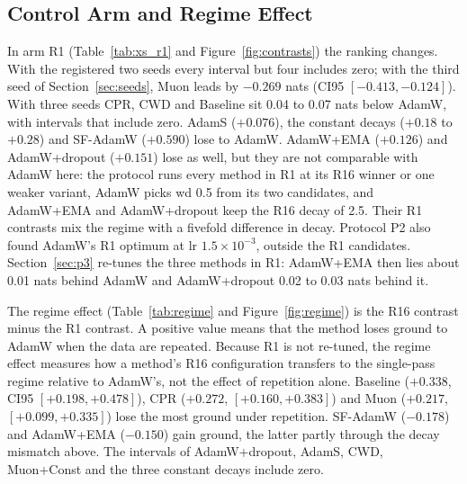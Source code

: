 \documentclass[twoside,11pt]{article}
\begin{document}
\subsection{Control Arm and Regime Effect}
\label{sec:r1}

In arm R1 (Table~\ref{tab:xs_r1} and Figure~\ref{fig:contrasts}) the ranking changes. With the registered two seeds every interval but four includes zero; with the third seed of Section~\ref{sec:seeds}, Muon leads by $-0.269$ nats (CI95 $[-0.413, -0.124]$). With three seeds CPR, CWD and Baseline sit 0.04 to 0.07 nats below AdamW, with intervals that include zero. AdamS ($+0.076$), the constant decays ($+0.18$ to $+0.28$) and SF-AdamW ($+0.590$) lose to AdamW. AdamW+EMA ($+0.126$) and AdamW+dropout ($+0.151$) lose as well, but they are not comparable with AdamW here: the protocol runs every method in R1 at its R16 winner or one weaker variant, AdamW picks wd 0.5 from its two candidates, and AdamW+EMA and AdamW+dropout keep the R16 decay of 2.5. Their R1 contrasts mix the regime with a fivefold difference in decay. Protocol P2 also found AdamW's R1 optimum at lr $1.5\times10^{-3}$, outside the R1 candidates. Section~\ref{sec:p3} re-tunes the three methods in R1: AdamW+EMA then lies about 0.01 nats behind AdamW and AdamW+dropout 0.02 to 0.03 nats behind it.

\begin{table}[t]
\centering
\footnotesize
\resizebox{\textwidth}{!}{}
\caption{XS, R1 (159.4M tokens $\times$ 1 epoch): test loss at the best-validation checkpoint, $n = 2$ seeds (the registered design; Section~\ref{sec:seeds} adds a third). Columns as in Table~\ref{tab:xs_r16}. Every method runs at its R16 winner or one weaker variant; AdamW+EMA and AdamW+dropout keep wd 2.5 while AdamW picks wd 0.5.}
\label{tab:xs_r1}
\end{table}

The regime effect (Table~\ref{tab:regime} and Figure~\ref{fig:regime}) is the R16 contrast minus the R1 contrast. A positive value means that the method loses ground to AdamW when the data are repeated. Because R1 is not re-tuned, the regime effect measures how a method's R16 configuration transfers to the single-pass regime relative to AdamW's, not the effect of repetition alone. Baseline ($+0.338$, CI95 $[+0.198, +0.478]$), CPR ($+0.272$, $[+0.160, +0.383]$) and Muon ($+0.217$, $[+0.099, +0.335]$) lose the most ground under repetition. SF-AdamW ($-0.178$) and AdamW+EMA ($-0.150$) gain ground, the latter partly through the decay mismatch above. The intervals of AdamW+dropout, AdamS, CWD, Muon+Const and the three constant decays include zero.
\end{document}
